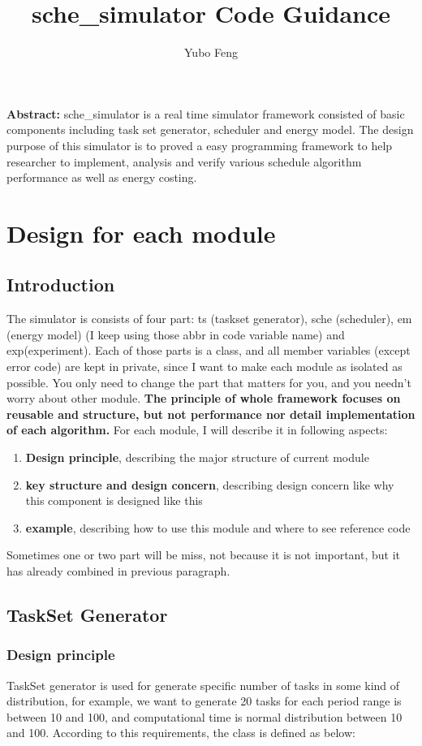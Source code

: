 \documentclass[11pt, oneside]{article}
\title{sche\_simulator Code Guidance}
\author{Yubo Feng}
\begin{document}
\maketitle
\textbf{Abstract:} sche\_simulator is a real time simulator framework consisted of basic components including task set generator, scheduler and energy model. The design purpose of this simulator is to proved a easy programming framework to help researcher to implement, analysis and verify various schedule algorithm performance as well as energy costing. 

\section{Design for each module}
\subsection{Introduction}
The simulator is consists of four part: ts (taskset generator), sche (scheduler), em (energy model) (I keep using those abbr in code variable name) and exp(experiment). Each of those parts is a class, and all member variables (except error code) are kept in private, since I want to make each module as isolated as possible. You only need to change the part that matters for you, and you needn't worry about other module. \textbf{The principle of whole framework focuses on reusable and structure, but not performance nor detail implementation of each algorithm.} For each module, I will describe it in following aspects:
\begin{enumerate}
\item \textbf{Design principle}, describing the major structure of current module
\item \textbf{key structure and design concern}, describing design concern like why this component is designed like this
\item \textbf{example}, describing how to use this module and where to see reference code
\end{enumerate}
Sometimes one or two part will be miss, not because it is not important, but it has already combined in previous paragraph.

\subsection{TaskSet Generator}
\subsubsection{Design principle}
TaskSet generator is used for generate specific number of tasks in some kind of distribution, for example, we want to generate 20 tasks for each period range is between 10 and 100, and computational time is normal distribution between 10 and 100. According to this requirements, the class is defined as below: \\
\end{document}
